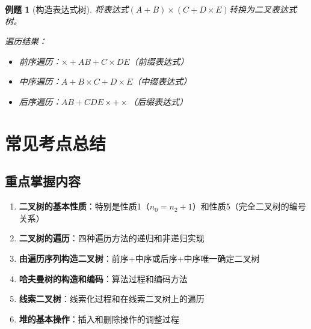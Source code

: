 \documentclass[12pt,a4paper]{amsart}
\newtheorem{example}{例题}[section]
\begin{document}
\begin{example}[构造表达式树]
将表达式$(A+B) \times (C+D \times E)$转换为二叉表达式树。

\begin{center}
\end{center}

遍历结果：
\begin{itemize}
\item 前序遍历：$\times + A B + C \times D E$（前缀表达式）
\item 中序遍历：$A + B \times C + D \times E$（中缀表达式）
\item 后序遍历：$A B + C D E \times + \times$（后缀表达式）
\end{itemize}
\end{example}

\section{常见考点总结}

\subsection{重点掌握内容}

\begin{enumerate}
\item \textbf{二叉树的基本性质}：特别是性质1（$n_0 = n_2 + 1$）和性质5（完全二叉树的编号关系）
\item \textbf{二叉树的遍历}：四种遍历方法的递归和非递归实现
\item \textbf{由遍历序列构造二叉树}：前序+中序或后序+中序唯一确定二叉树
\item \textbf{哈夫曼树的构造和编码}：算法过程和编码方法
\item \textbf{线索二叉树}：线索化过程和在线索二叉树上的遍历
\item \textbf{堆的基本操作}：插入和删除操作的调整过程
\end{enumerate}
\end{document}
